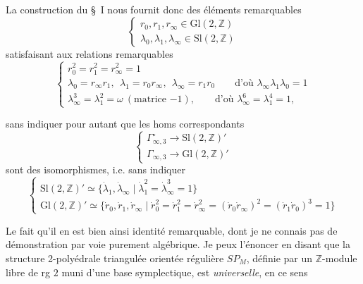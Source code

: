 \documentclass[11pt,a4paper]{article}
\begin{document}


La construction du §~I nous fournit donc des éléments remarquables
\[
\begin{cases}
r_0, r_1, r_\infty \in \mathrm{Gl}(2,\mathbb{Z}) \\
\lambda_0, \lambda_1, \lambda_\infty \in \mathrm{Sl}(2,\mathbb{Z})
\end{cases}
\]
satisfaisant aux relations remarquables
\[
\begin{cases}
r_0^2 = r_1^2 = r_\infty^2 = 1 \\
\lambda_0 = r_\infty r_1, \ \ \lambda_1 = r_0 r_\infty, \ \ \lambda_\infty = r_1 r_0 \qquad \text{d'où } \lambda_\infty \lambda_1 \lambda_0 = 1 \\
\lambda_\infty^{3} = \lambda_1^2 = \omega \ (\text{matrice } {-1}), \qquad \text{d'où } \lambda_\infty^6 = \lambda_1^4 = 1 ,
\end{cases}
\]

sans indiquer pour autant que les homs correspondants
\[
\begin{cases}
\Gamma^{\circ}_{\infty,3} \longrightarrow \mathrm{Sl}(2,\mathbb{Z})' \\
\Gamma_{\infty,3} \longrightarrow \mathrm{Gl}(2,\mathbb{Z})'
\end{cases}
\]
sont des isomorphismes, i.e. sans indiquer
\[
\begin{cases}
\mathrm{Sl}(2,\mathbb{Z})' \simeq \{\dot\lambda_1, \dot\lambda_\infty \mid \dot\lambda_1^2 = \dot\lambda_\infty^3 = 1\} \\
\mathrm{Gl}(2,\mathbb{Z})' \simeq \{\dot r_0, \dot r_1, \dot r_\infty \mid \dot r_0^2 = \dot r_1^2 = \dot r_\infty^2 = (\dot r_0 \dot r_\infty)^2 = (\dot r_1 \dot r_0)^3 = 1\}
\end{cases}
\]

Le fait qu'il en est bien ainsi \struck{\ill{}} \ill{} identité remarquable, dont je ne connais pas de démonstration par voie purement algébrique. Je peux l'énoncer en disant que la structure 2-polyédrale triangulée orientée régulière  $SP_M$, définie par un $\mathbb{Z}$-module libre de rg $2$ muni d'une base symplectique, est \emph{universelle}, en ce sens
\end{document}
